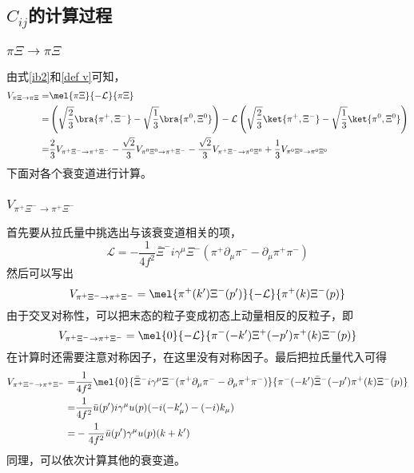 \subsection{$C_{ij}$的计算过程}
\label{appendices a}
\subsubsection{$\pi\Xi\to\pi\Xi$}
由式\eqref{ib2}和\eqref{def v}可知，
\begin{equation}
\begin{split}
	V_{\pi\Xi\rightarrow\pi\Xi}=&\mel{\pi\Xi}{-\mathcal{L}}{\pi\Xi}\\
	=&\left(\sqrt{\frac{2}{3}}\bra{\pi^{+},\Xi^{-}}-\sqrt{\frac{1}{3}}\bra{\pi^{0},\Xi^{0}}\right)-\mathcal{L}\left(\sqrt{\frac{2}{3}}\ket{\pi^{+},\Xi^{-}}-\sqrt{\frac{1}{3}}\ket{\pi^{0},\Xi^{0}}\right)\\
	=&\frac{2}{3}V_{\pi^{+}\Xi^{-}\rightarrow\pi^{+}\Xi^{-}}-\frac{\sqrt{2}}{3}V_{\pi^{0}\Xi^{0}\rightarrow\pi^{+}\Xi^{-}}-\frac{\sqrt{2}}{3}V_{\pi^{+}\Xi^{-}\rightarrow\pi^{0}\Xi^{0}}+\frac{1}{3}V_{\pi^{0}\Xi^{0}\rightarrow\pi^{0}\Xi^{0}}
\end{split}
\end{equation}
下面对各个衰变道进行计算。
\subsubsection{$V_{\pi^{+}\Xi^{-}\to\pi^{+}\Xi^{-}}$}
首先要从拉氏量中挑选出与该衰变道相关的项，
\begin{equation}
	\mathcal{L}=-\frac{1}{4f^2}\bar{\Xi}^{-}i\gamma^{\mu}\Xi^{-}(\pi^{+}\partial_{\mu}\pi^{-}-\partial_{\mu}\pi^{+}\pi^{-})
\end{equation}
然后可以写出
\begin{equation}
	V_{\pi^{+}\Xi^{-}\rightarrow\pi^{+}\Xi^{-}}=\mel{\pi^{+}(k')\Xi^{-}(p')}{-\mathcal{L}}{\pi^{+}(k)\Xi^{-}(p)}
\end{equation}
由于交叉对称性，可以把末态的粒子变成初态上动量相反的反粒子\cite{peskin2018introduction}，即
\begin{equation}
	V_{\pi^{+}\Xi^{-}\rightarrow\pi^{+}\Xi^{-}}=\mel{0}{-\mathcal{L}}{\pi^{-}(-k')\Xi^{+}(-p')\pi^{+}(k)\Xi^{-}(p)}
\end{equation}
在计算时还需要注意对称因子，在这里没有对称因子。最后把拉氏量代入可得
\begin{equation}
\begin{split}
	V_{\pi^{+}\Xi^{-}\rightarrow\pi^{+}\Xi^{-}}=&\frac{1}{4f^2}\mel{0}{\bar{\Xi}^{-}i\gamma^{\mu}\Xi^{-}(\pi^{+}\partial_{\mu}\pi^{-}-\partial_{\mu}\pi^{+}\pi^{-})}{\pi^{-}(-k')\bar{\Xi}^{-}(-p')\pi^{+}(k)\Xi^{-}(p)}\\
	=&\frac{1}{4f^2}\bar{u}(p')i\gamma^{\mu}u(p)(-i(-k_{\mu}')-(-i)k_{\mu})\\
	=&-\frac{1}{4f^2}\bar{u}(p')\gamma^{\mu}u(p)(k+k')
\end{split}
\end{equation}
同理，可以依次计算其他的衰变道。
